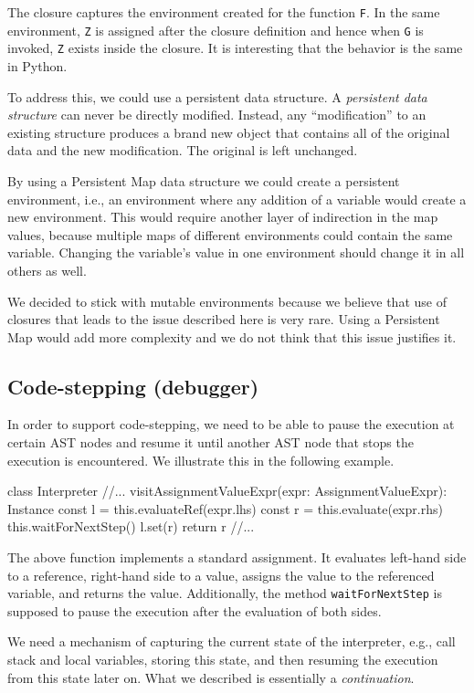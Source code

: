The closure captures the environment created for the function \texttt{F}. In the same environment, \texttt{Z} is assigned after the closure definition and hence
when \texttt{G} is invoked, \texttt{Z} exists inside the closure. It is interesting that the behavior is the same in Python.

To address this, we could use a persistent data structure. A \emph{persistent data structure} can never be directly modified. Instead, any ``modification''
to an existing structure produces a brand new object that contains all of the original data and the new modification. The original is left unchanged.

By using a Persistent Map data structure we could create a persistent environment, i.e., an environment where any addition of a variable would create 
a new environment. This would require another layer of indirection in the map values, because multiple maps of different environments could contain the same
variable. Changing the variable's value in one environment should change it in all others as well.

We decided to stick with mutable environments because we believe that use of closures that leads to the issue described here is very rare. Using
a Persistent Map would add more complexity and we do not think that this issue justifies it.

\subsection{Code-stepping (debugger)}
In order to support code-stepping, we need to be able to pause the execution at certain AST nodes and resume it until another AST node that stops the execution
is encountered. We illustrate this in the following example.
\begin{code}
class Interpreter {
    //...
    visitAssignmentValueExpr(expr: AssignmentValueExpr): Instance {
        const l = this.evaluateRef(expr.lhs)
        const r = this.evaluate(expr.rhs)
        this.waitForNextStep()
        l.set(r)
        return r
    }
    //...
}
\end{code}
The above function implements a standard assignment. It evaluates left-hand side to a reference, right-hand side to a value, assigns the value to the
referenced variable, and returns the value. Additionally, the method \texttt{waitForNextStep} is supposed to pause the execution after the evaluation of 
both sides.

We need a mechanism of capturing the current state of the interpreter, e.g., call stack and local variables, storing this state, and then resuming the execution
from this state later on. What we described is essentially a \emph{continuation}.

